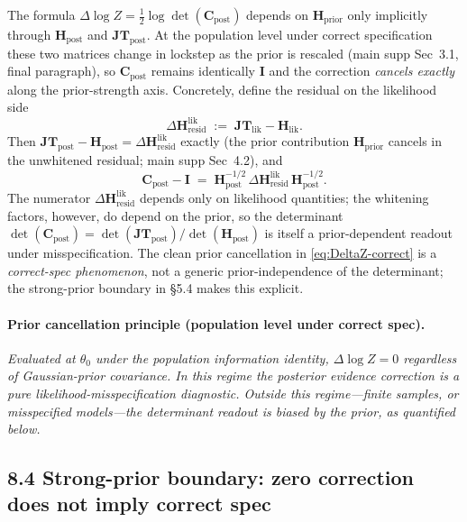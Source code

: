 \documentclass[11pt]{article}
\begin{document}
The formula $\Delta\log Z = \tfrac{1}{2}\log\det(\mathbf C_{\mathrm{post}})$ depends on
$\mathbf H_{\mathrm{prior}}$ only implicitly through $\mathbf H_{\mathrm{post}}$ and
$\mathbf{JT}_{\mathrm{post}}$. At the population level under correct specification these
two matrices change in lockstep as the prior is rescaled (main supp Sec~3.1, final
paragraph), so $\mathbf C_{\mathrm{post}}$ remains identically $\mathbf I$ and the
correction \emph{cancels exactly} along the prior-strength axis. Concretely, define the
residual on the likelihood side
\begin{equation}
\Delta\mathbf{H}^{\mathrm{lik}}_{\mathrm{resid}}
\;:=\;
\mathbf{JT}_{\mathrm{lik}} - \mathbf H_{\mathrm{lik}}.
\label{eq:lik-residual}
\end{equation}
Then $\mathbf{JT}_{\mathrm{post}} - \mathbf H_{\mathrm{post}} = \Delta\mathbf{H}^{\mathrm{lik}}_{\mathrm{resid}}$
exactly (the prior contribution $\mathbf H_{\mathrm{prior}}$ cancels in the unwhitened
residual; main supp Sec~4.2), and
\begin{equation}
\mathbf C_{\mathrm{post}} - \mathbf I
\;=\;
\mathbf H_{\mathrm{post}}^{-1/2}\,
\Delta\mathbf{H}^{\mathrm{lik}}_{\mathrm{resid}}\,
\mathbf H_{\mathrm{post}}^{-1/2}.
\label{eq:Cpost-residual}
\end{equation}
The numerator $\Delta\mathbf{H}^{\mathrm{lik}}_{\mathrm{resid}}$ depends only on
likelihood quantities; the whitening factors, however, do depend on the prior, so the
determinant $\det(\mathbf C_{\mathrm{post}}) = \det(\mathbf{JT}_{\mathrm{post}})/\det(\mathbf H_{\mathrm{post}})$
is itself a prior-dependent readout under misspecification. The clean prior cancellation
in \eqref{eq:DeltaZ-correct} is a \emph{correct-spec phenomenon}, not a generic
prior-independence of the determinant; the strong-prior boundary in \S5.4 makes this
explicit.

\paragraph{Prior cancellation principle (population level under correct spec).}
\emph{Evaluated at $\theta_0$ under the population information identity, $\Delta\log Z = 0$
regardless of Gaussian-prior covariance. In this regime the posterior evidence correction
is a pure likelihood-misspecification diagnostic. Outside this regime---finite samples,
or misspecified models---the determinant readout is biased by the prior, as quantified
below.}

\subsection*{8.4 Strong-prior boundary: zero correction does not imply correct spec}
\end{document}
